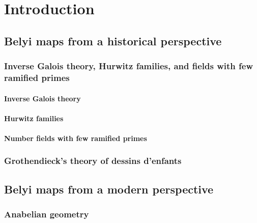 \documentclass{dcthesis}
\theoremstyle{definition}
\theoremstyle{remark}
\begin{document}
\chapter{Introduction}{\label{chapter:intro}
  \section{Belyi maps from a historical perspective}{
    \lipsum[1]
    \cite{serre}
    \subsection[Inverse Galois theory]{Inverse Galois theory, Hurwitz families, and fields with few ramified primes}{
      \lipsum[1]
      \subsubsection{Inverse Galois theory}{
        \lipsum[1]
      }
      \subsubsection{Hurwitz families}{
        \lipsum[1]
      }
      \subsubsection{Number fields with few ramified primes}{
        \lipsum[1]
      }
    }
    \subsection[Dessins d'enfants]{Grothendieck's theory of dessins d'enfants}{
      \lipsum[1]
    }
  }
  \section{Belyi maps from a modern perspective}{
    \lipsum[1]
    \subsection{Anabelian geometry}{
      \lipsum[1]
    }
  }
}
\end{document}
